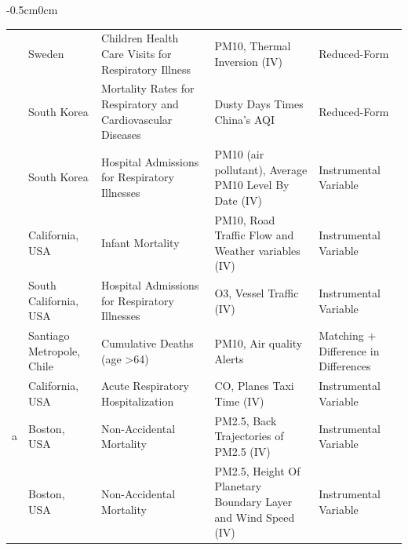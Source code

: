 \begin{table}[]
\begin{adjustwidth}{-0.5cm}{0cm}
\begin{threeparttable}
\begin{tabular}{p{2.5cm}p{3cm}p{7cm}p{7cm}p{4cm}}
\rowcolor{Gray}
\cite{jans_economic_2018}           & Sweden                      & Children Health Care Visits for Respiratory Illness         & PM10, Thermal Inversion (IV)                                       & Reduced-Form                             \\
\cite{jia_is_2019}            & South Korea                 & Mortality Rates for Respiratory and Cardiovascular Diseases & Dusty Days Times China's AQI                                                       & Reduced-Form                                      \\
\rowcolor{Gray}
\cite{kim_sensitivity_2013}            & South Korea                 & Hospital Admissions for Respiratory Illnesses               & PM10 (air pollutant), Average PM10 Level By Date (IV)                              & Instrumental Variable                             \\
\cite{knittel_caution_2016}        & California, USA             & Infant Mortality                                            & PM10, Road Traffic Flow and Weather variables (IV)                 & Instrumental Variable                             \\
\rowcolor{Gray}
\cite{moretti_pollution_2011}        & South California, USA       & Hospital Admissions for Respiratory Illnesses               & O3, Vessel Traffic (IV)                                            & Instrumental Variable                             \\
\cite{mullins_effects_2015}       & Santiago Metropole, Chile   & Cumulative Deaths (age \textgreater 64)                     & PM10, Air quality Alerts                                           & Matching + Difference in Differences              \\
\rowcolor{Gray}
\cite{schlenker_airports_2016}     & California, USA             & Acute Respiratory Hospitalization                           & CO,  Planes Taxi Time (IV)                                         & Instrumental Variable                             \\
\cite{schwartz_estimating_2015}a       & Boston, USA                 & Non-Accidental Mortality                                    & PM2.5, Back Trajectories of PM2.5 (IV)                             & Instrumental Variable                             \\
\rowcolor{Gray}
\cite{schwartz_estimating_2017}       & Boston, USA                 & Non-Accidental Mortality                                    & PM2.5, Height Of Planetary Boundary Layer and Wind Speed (IV)      & Instrumental Variable                             \\

\end{tabular}
\end{threeparttable}
\end{adjustwidth}
\end{table}
